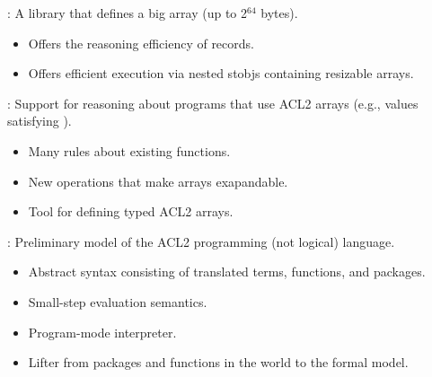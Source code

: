 





\begin{frame}[fragile]

\newlibtitle

:
A library that defines a big array (up to 2$^{64}$ bytes).
\begin{itemize}
\item Offers the reasoning efficiency of records.
\item Offers efficient execution via nested stobjs containing resizable arrays.
\end{itemize}

\end{frame}


\begin{frame}

\newlibtitle

:
Support for reasoning about programs that use ACL2 arrays (e.g.,
values satisfying ).

\begin{itemize}
\item Many rules about existing functions.
\item New operations that make arrays exapandable.
\item Tool for defining typed ACL2 arrays.
\end{itemize}

\end{frame}


\begin{frame}[fragile]

\newlibtitle

:
Preliminary model of the ACL2 programming (not logical) language.
\begin{itemize}
\item Abstract syntax consisting of translated terms, functions, and packages.
\item Small-step evaluation semantics.
\item Program-mode interpreter.
\item Lifter from packages and functions in the world to the formal model.
\end{itemize}

\end{frame}

